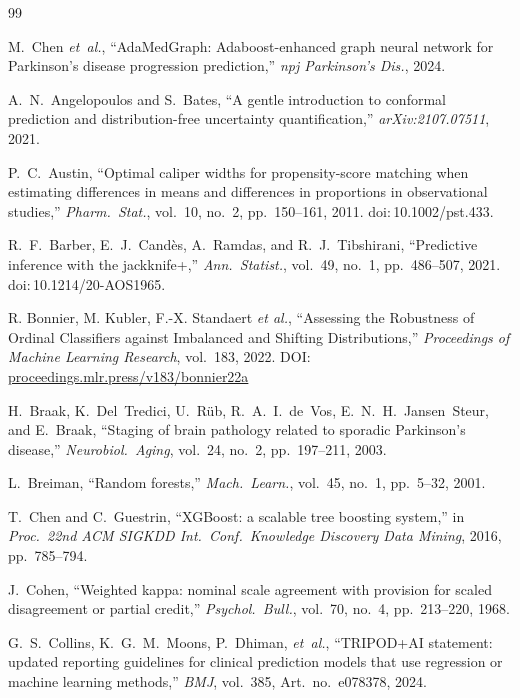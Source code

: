 \begin{thebibliography}{99}

M.~Chen \textit{et~al.}, ``AdaMedGraph: Adaboost-enhanced graph neural network for Parkinson's disease progression prediction,'' \textit{npj Parkinson's Dis.}, 2024.

A.~N.~Angelopoulos and S.~Bates, ``A gentle introduction to conformal prediction and distribution-free uncertainty quantification,'' \textit{arXiv:2107.07511}, 2021.

P.~C.~Austin, ``Optimal caliper widths for propensity-score matching when estimating differences in means and differences in proportions in observational studies,'' \textit{Pharm.\ Stat.}, vol.~10, no.~2, pp.~150--161, 2011. doi:\,10.1002/pst.433.

R.~F.~Barber, E.~J.~Cand\`{e}s, A.~Ramdas, and R.~J.~Tibshirani, ``Predictive inference with the jackknife+,'' \textit{Ann.\ Statist.}, vol.~49, no.~1, pp.~486--507, 2021. doi:\,10.1214/20-AOS1965.

R. Bonnier, M. Kubler, F.-X. Standaert \textit{et al.},
``Assessing the Robustness of Ordinal Classifiers against Imbalanced and Shifting Distributions,''
\textit{Proceedings of Machine Learning Research}, vol.~183, 2022. DOI: \href{https://proceedings.mlr.press/v183/bonnier22a.html}{proceedings.mlr.press/v183/bonnier22a}

H.~Braak, K.~Del~Tredici, U.~R\"{u}b, R.~A.~I.~de~Vos, E.~N.~H.~Jansen~Steur, and E.~Braak, ``Staging of brain pathology related to sporadic Parkinson's disease,'' \textit{Neurobiol.\ Aging}, vol.~24, no.~2, pp.~197--211, 2003.

L.~Breiman, ``Random forests,'' \textit{Mach.\ Learn.}, vol.~45, no.~1, pp.~5--32, 2001.

T.~Chen and C.~Guestrin, ``XGBoost: a scalable tree boosting system,'' in \textit{Proc.\ 22nd ACM SIGKDD Int.\ Conf.\ Knowledge Discovery Data Mining}, 2016, pp.~785--794.

J.~Cohen, ``Weighted kappa: nominal scale agreement with provision for scaled disagreement or partial credit,'' \textit{Psychol.\ Bull.}, vol.~70, no.~4, pp.~213--220, 1968.

G.~S.~Collins, K.~G.~M.~Moons, P.~Dhiman, \textit{et~al.}, ``TRIPOD+AI statement: updated reporting guidelines for clinical prediction models that use regression or machine learning methods,'' \textit{BMJ}, vol.~385, Art.\ no.~e078378, 2024.


\end{thebibliography}
